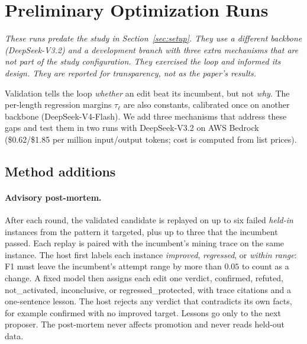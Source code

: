 \providecommand{\sid}[1]{\textbf{\texttt{#1}}}
\providecommand{\hzero}{\ensuremath{\mathrm{H}_{0}}\xspace}
\providecommand{\hzerostar}{\ensuremath{\mathrm{H}_{0}^{*}}\xspace}
\providecommand{\shrlm}{\textsc{SH-RLM}\xspace}
\providecommand{\TODO}[1]{\textcolor{red}{[TODO: #1]}}
\providecommand{\verdict}[1]{\textsf{#1}}

\section{Preliminary Optimization Runs}
\label{sec:diag}

\emph{These runs predate the study in Section~\ref{sec:setup}. They use a
different backbone (DeepSeek-V3.2) and a development branch with three extra
mechanisms that are not part of the study configuration. They exercised the
loop and informed its design. They are reported for transparency, not as the
paper's results.}

Validation tells the loop \emph{whether} an edit beat its incumbent, but not
\emph{why}. The per-length regression margins $\tau_\ell$ are also constants,
calibrated once on another backbone (DeepSeek-V4-Flash). We add three
mechanisms that address these gaps and test them in two runs with DeepSeek-V3.2
on AWS Bedrock (\$0.62/\$1.85 per million input/output tokens; cost is computed
from list prices).

\subsection{Method additions}

\paragraph{Advisory post-mortem.}
After each round, the validated candidate is replayed on up to six failed
\emph{held-in} instances from the pattern it targeted, plus up to three that the
incumbent passed. Each replay is paired with the incumbent's mining trace on the
same instance. The host first labels each instance \emph{improved},
\emph{regressed}, or \emph{within range}: F1 must leave the incumbent's attempt
range by more than $0.05$ to count as a change. A fixed model then assigns each
edit one verdict, \verdict{confirmed}, \verdict{refuted},
\verdict{not\_activated}, \verdict{inconclusive}, or
\verdict{regressed\_protected}, with trace citations and a one-sentence lesson.
The host rejects any verdict that contradicts its own facts, for example
\verdict{confirmed} with no improved target. Lessons go only to the next
proposer. The post-mortem never affects promotion and never reads held-out data.

